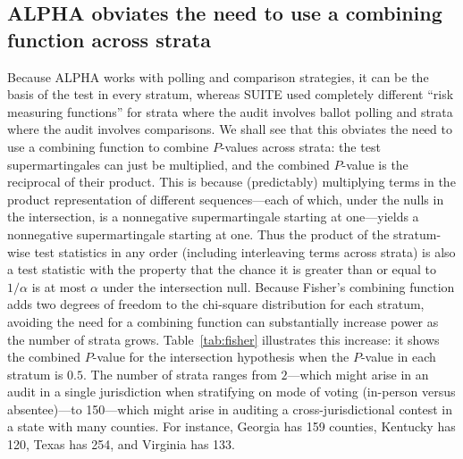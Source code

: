 \documentclass[aoas]{imsart}
\begin{document}
\subsection{ALPHA obviates the need to use a combining function across strata}
Because ALPHA works with polling and comparison strategies, it can be the basis of the test in every stratum,
whereas SUITE used completely different ``risk measuring functions'' for strata where the audit involves ballot polling and strata
where the audit involves comparisons.
We shall see that this obviates the need to use a combining function to combine $P$-values across
strata: the test supermartingales can just be multiplied, and the combined $P$-value is the reciprocal of their product.
This is because (predictably) multiplying terms in the product representation of different sequences---each of which, under the nulls
in the intersection, is a nonnegative supermartingale
starting at one---yields a nonnegative supermartingale starting at one.
Thus the product of the stratum-wise test statistics in any order (including interleaving terms across strata) is also a test statistic 
with the property that the chance it is greater than or equal to $1/\alpha$ is at most $\alpha$ under the intersection null.
Because Fisher's combining function adds two degrees of freedom to the chi-square distribution for each stratum, avoiding 
the need for a combining function can substantially increase power as the number of strata grows.
Table~\ref{tab:fisher} illustrates this increase: it shows the combined $P$-value for the intersection hypothesis when the 
$P$-value in each
stratum is $0.5$. 
The number of strata ranges from $2$---which might arise in an audit in a single jurisdiction when
stratifying on mode of voting (in-person versus absentee)---to 150---which might arise in auditing a cross-jurisdictional
contest in a state with many counties.
For instance, Georgia has 159 counties, Kentucky has 120, Texas has 254, and Virginia has 133.
\end{document}
